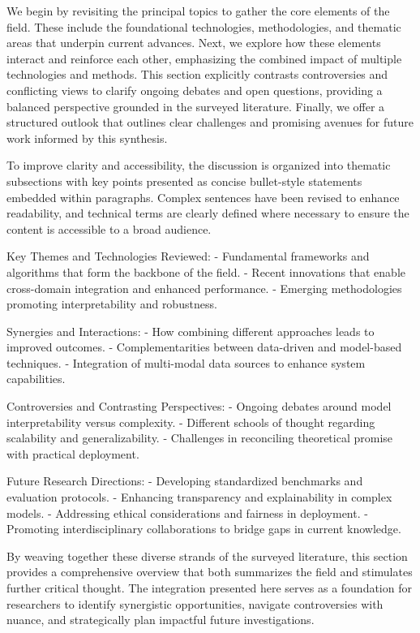 \documentclass[sigconf]{acmart}
\begin{document}
We begin by revisiting the principal topics to gather the core elements of the field. These include the foundational technologies, methodologies, and thematic areas that underpin current advances. Next, we explore how these elements interact and reinforce each other, emphasizing the combined impact of multiple technologies and methods. This section explicitly contrasts controversies and conflicting views to clarify ongoing debates and open questions, providing a balanced perspective grounded in the surveyed literature. Finally, we offer a structured outlook that outlines clear challenges and promising avenues for future work informed by this synthesis.

To improve clarity and accessibility, the discussion is organized into thematic subsections with key points presented as concise bullet-style statements embedded within paragraphs. Complex sentences have been revised to enhance readability, and technical terms are clearly defined where necessary to ensure the content is accessible to a broad audience.

Key Themes and Technologies Reviewed:
- Fundamental frameworks and algorithms that form the backbone of the field.
- Recent innovations that enable cross-domain integration and enhanced performance.
- Emerging methodologies promoting interpretability and robustness.

Synergies and Interactions:
- How combining different approaches leads to improved outcomes.
- Complementarities between data-driven and model-based techniques.
- Integration of multi-modal data sources to enhance system capabilities.

Controversies and Contrasting Perspectives:
- Ongoing debates around model interpretability versus complexity.
- Different schools of thought regarding scalability and generalizability.
- Challenges in reconciling theoretical promise with practical deployment.

Future Research Directions:
- Developing standardized benchmarks and evaluation protocols.
- Enhancing transparency and explainability in complex models.
- Addressing ethical considerations and fairness in deployment.
- Promoting interdisciplinary collaborations to bridge gaps in current knowledge.

By weaving together these diverse strands of the surveyed literature, this section provides a comprehensive overview that both summarizes the field and stimulates further critical thought. The integration presented here serves as a foundation for researchers to identify synergistic opportunities, navigate controversies with nuance, and strategically plan impactful future investigations.
\end{document}

